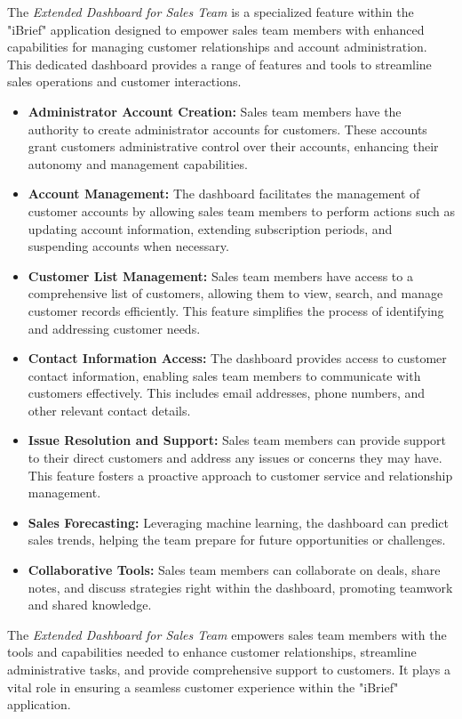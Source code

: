 The \textit{Extended Dashboard for Sales Team} is a specialized feature within the "iBrief" application designed to empower sales team members with enhanced capabilities for managing customer relationships and account administration. This dedicated dashboard provides a range of features and tools to streamline sales operations and customer interactions.
    \begin{itemize}
        \item \textbf{Administrator Account Creation:}
        Sales team members have the authority to create administrator accounts for customers. These accounts grant customers administrative control over their accounts, enhancing their autonomy and management capabilities.
        
        \item \textbf{Account Management:}
        The dashboard facilitates the management of customer accounts by allowing sales team members to perform actions such as updating account information, extending subscription periods, and suspending accounts when necessary.
    
        \item \textbf{Customer List Management:}
        Sales team members have access to a comprehensive list of customers, allowing them to view, search, and manage customer records efficiently. This feature simplifies the process of identifying and addressing customer needs.
        
        \item \textbf{Contact Information Access:}
        The dashboard provides access to customer contact information, enabling sales team members to communicate with customers effectively. This includes email addresses, phone numbers, and other relevant contact details.
        
        \item \textbf{Issue Resolution and Support:}
        Sales team members can provide support to their direct customers and address any issues or concerns they may have. This feature fosters a proactive approach to customer service and relationship management.

        \item \textbf{Sales Forecasting:}
        Leveraging machine learning, the dashboard can predict sales trends, helping the team prepare for future opportunities or challenges.
    
        \item \textbf{Collaborative Tools:}
        Sales team members can collaborate on deals, share notes, and discuss strategies right within the dashboard, promoting teamwork and shared knowledge.
    \end{itemize}
    
The \textit{Extended Dashboard for Sales Team} empowers sales team members with the tools and capabilities needed to enhance customer relationships, streamline administrative tasks, and provide comprehensive support to customers. It plays a vital role in ensuring a seamless customer experience within the "iBrief" application.